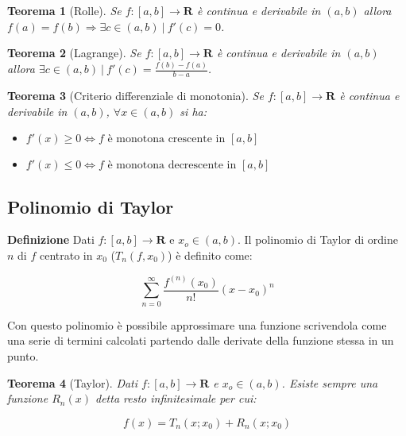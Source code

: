 \documentclass{article}
\newtheorem{theorem}{Teorema}
\begin{document}
\begin{theorem}[Rolle]
    Se $f:[a,b]\rightarrow\mathbf{R}$ è continua e derivabile in $(a,b)$ allora $f(a)=f(b)\Rightarrow\exists c\in (a,b)\ |\ f'(c)=0$.\newline
\end{theorem}

\begin{theorem}[Lagrange]
    Se $f:[a,b]\rightarrow\mathbf{R}$ è continua e derivabile in $(a,b)$ allora $\exists c\in (a,b)\ |\ f'(c)=\frac{f(b)-f(a)}{b-a}$.\newline
\end{theorem}

\begin{theorem}[Criterio differenziale di monotonia]
    Se $f:[a,b]\rightarrow\mathbf{R}$ è continua e derivabile in $(a,b)$, $\forall x\in(a,b)$ si ha:
    \begin{itemize}
        \item $f'(x)\geq0\iff f\text{ è monotona crescente in }[a,b]$
        \item $f'(x)\leq0\iff f\text{ è monotona decrescente in }[a,b]$\newline
    \end{itemize}
    
\end{theorem}

\subsection{Polinomio di Taylor}

\textbf{Definizione} Dati $f:[a,b]\rightarrow\mathbf{R}$ e $x_o\in(a,b)$. Il polinomio di Taylor di ordine $n$ di $f$ centrato in $x_0$ ($T_n(f,x_0)$) è definito come:

$$\sum_{n=0}^{\infty}\frac{f^{(n)}(x_0)}{n!}(x-x_0)^n$$\newline

\noindent Con questo polinomio è possibile approssimare una funzione scrivendola come una serie di termini calcolati partendo dalle derivate della funzione stessa in un punto.\newline

\begin{theorem}[Taylor]
    Dati $f:[a,b]\rightarrow\mathbf{R}$ e $x_o\in(a,b)$. Esiste sempre una funzione $R_n(x)$ detta resto infinitesimale per cui:

    $$f(x)=T_n(x;x_0)+R_n(x;x_0)$$
    
\end{theorem}
\end{document}
